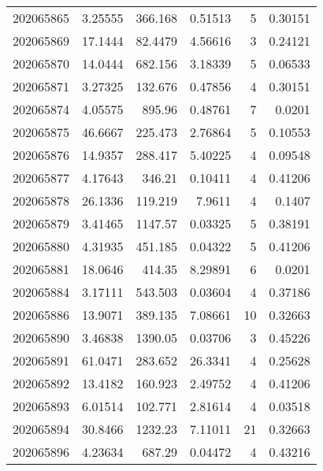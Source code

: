 \begin{tabular}{rrrrrr}
 202065865 &          3.25555 &      366.168  &            0.51513 &           5 & 0.30151 \\
 202065869 &         17.1444  &       82.4479 &            4.56616 &           3 & 0.24121 \\
 202065870 &         14.0444  &      682.156  &            3.18339 &           5 & 0.06533 \\
 202065871 &          3.27325 &      132.676  &            0.47856 &           4 & 0.30151 \\
 202065874 &          4.05575 &      895.96   &            0.48761 &           7 & 0.0201  \\
 202065875 &         46.6667  &      225.473  &            2.76864 &           5 & 0.10553 \\
 202065876 &         14.9357  &      288.417  &            5.40225 &           4 & 0.09548 \\
 202065877 &          4.17643 &      346.21   &            0.10411 &           4 & 0.41206 \\
 202065878 &         26.1336  &      119.219  &            7.9611  &           4 & 0.1407  \\
 202065879 &          3.41465 &     1147.57   &            0.03325 &           5 & 0.38191 \\
 202065880 &          4.31935 &      451.185  &            0.04322 &           5 & 0.41206 \\
 202065881 &         18.0646  &      414.35   &            8.29891 &           6 & 0.0201  \\
 202065884 &          3.17111 &      543.503  &            0.03604 &           4 & 0.37186 \\
 202065886 &         13.9071  &      389.135  &            7.08661 &          10 & 0.32663 \\
 202065890 &          3.46838 &     1390.05   &            0.03706 &           3 & 0.45226 \\
 202065891 &         61.0471  &      283.652  &           26.3341  &           4 & 0.25628 \\
 202065892 &         13.4182  &      160.923  &            2.49752 &           4 & 0.41206 \\
 202065893 &          6.01514 &      102.771  &            2.81614 &           4 & 0.03518 \\
 202065894 &         30.8466  &     1232.23   &            7.11011 &          21 & 0.32663 \\
 202065896 &          4.23634 &      687.29   &            0.04472 &           4 & 0.43216 \\

\end{tabular}
